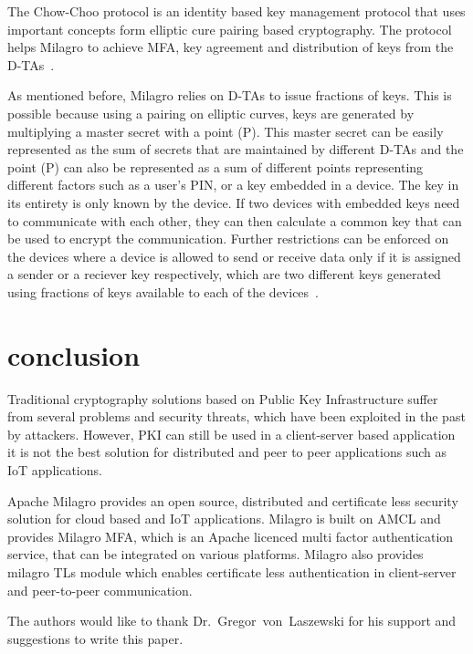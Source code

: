 The Chow-Choo protocol is an identity based key management protocol
that uses important concepts form elliptic cure pairing based
cryptography. The protocol helps Milagro to achieve MFA, key agreement
and distribution of keys from the D-TAs~\cite{milagro-protocols}.


As mentioned before, Milagro relies on D-TAs to issue fractions of
keys. This is possible because using a pairing on elliptic curves,
keys are generated by multiplying a master secret with a point
(P). This master secret can be easily represented as the sum of
secrets that are maintained by different D-TAs and the point (P) can
also be represented as a sum of different points representing
different factors such as a user's PIN, or a key embedded in a
device. The key in its entirety is only known by the device. If two
devices with embedded keys need to communicate with each other, they
can then calculate a common key that can be used to encrypt the
communication. Further restrictions can be enforced on the devices
where a device is allowed to send or receive data only if it is
assigned a sender or a reciever key respectively, which are two
different keys generated using fractions of keys available to each of
the devices~\cite{milagro-protocols}.

\section{conclusion}
Traditional cryptography solutions based on Public Key Infrastructure
suffer from several problems and security threats, which have been
exploited in the past by attackers. However, PKI can still be used in a
client-server based application it is not the best solution for
distributed and peer to peer applications such as IoT applications.

Apache Milagro provides an open source, distributed and certificate
less security solution for cloud based and IoT applications. Milagro
is built on AMCL and provides Milagro MFA, which is an Apache licenced
multi factor authentication service, that can be integrated on various
platforms. Milagro also provides milagro TLs module which enables
certificate less authentication in client-server and peer-to-peer
communication.

\begin{acks}

  The authors would like to thank Dr.~Gregor~von~Laszewski for his
  support and suggestions to write this paper.

\end{acks}




 
